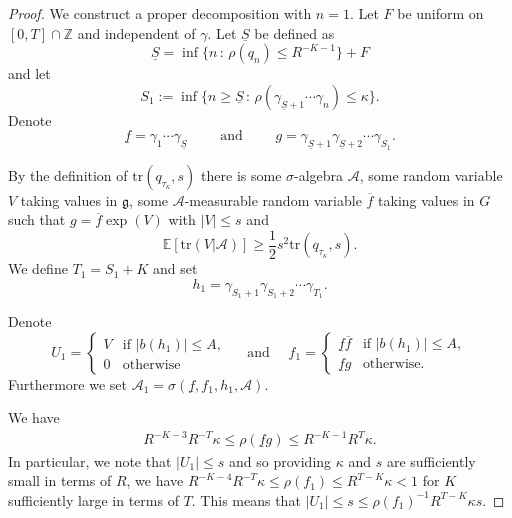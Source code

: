 \documentclass[10pt, english,oneside,reqno]{amsart}
\theoremstyle{plain}
\theoremstyle{remark}
\numberwithin{equation}{section}
\numberwithin{figure}{section}
\newcommand{\tr}{\mathrm{tr}}
\newcommand{\Z}{\mathbb{Z}}
\newcommand{\E}{\mathbb{E}}
\begin{document}
\begin{proof}
    We construct a proper decomposition with $n = 1$. Let $F$ be uniform on $[0, T] \cap \Z$ and independent of $\gamma$. Let $\underline{S}$ be defined as $$\underline{S} = \inf\{ n \,:\, \rho(q_n) \leq R^{-K-1}  \} + F$$ and let $$S_1 := \inf\{ n \geq \underline{S} \,:\, \rho(\gamma_{\underline{S} + 1}\cdots \gamma_n) \leq \kappa \}.$$ Denote $$\underline{f} = \gamma_1 \cdots \gamma_{\underline{S}} \quad\quad \text{ and } \quad\quad g = \gamma_{\underline{S} + 1} \gamma_{\underline{S} + 2} \cdots \gamma_{S_1}.$$ 

    By the definition of $\mathrm{tr}(q_{\tau_{\kappa}},s)$ there is some $\sigma$-algebra $\mathscr{A}$, some random variable $V$ taking values in $\mathfrak{g}$, some $\mathscr{A}$-measurable random variable $\overline{f}$ taking values in $G$ such that $g = \overline{f}\exp(V)$ with $|V| \leq s$ and 
    \begin{equation}\label{TraceDef}
        \E[\tr(V|\mathscr{A})] \geq \frac{1}{2} s^2 \mathrm{tr}(q_{\tau_{\kappa}},s).
    \end{equation}
    We define $T_1 = S_1 + K$ and set $$h_1 = \gamma_{S_1 + 1} \gamma_{S_1 + 2} \cdots \gamma_{T_1}.$$
    
    Denote
    \begin{equation*}
        U_1 = \begin{cases}
        V & \text{if } |b(h_1)| \leq A, \\ 
        0 & \text{otherwise}
        \end{cases} \quad \text{ and } \quad 
        f_1 = \begin{cases}
        \underline{f}\overline{f} & \text{if } |b(h_1)| \leq A, \\ 
        \underline{f}g & \text{otherwise.}
        \end{cases}
    \end{equation*}
    Furthermore we set $\mathscr{A}_1 = \sigma(\underline{f},f_1, h_1, \mathscr{A})$.

    We have
    \begin{align*}
        R^{-K-3} R^{-T} \kappa \leq \rho(\underline{f}g) \leq R^{-K-1} R^T \kappa.
    \end{align*} In particular, we note that $|U_1| \leq s $ and so providing $\kappa$ and $s$ are sufficiently small in terms of $R$, we have $R^{-K-4}R^{-T}  \kappa \leq \rho( f_1) \leq R^{T-K}\kappa < 1$ for $K$ sufficiently large in terms of $T$. This means that $|U_1| \leq s \leq \rho(f_1)^{-1} R^{T-K}\kappa s$.
    

\end{proof}
\end{document}
